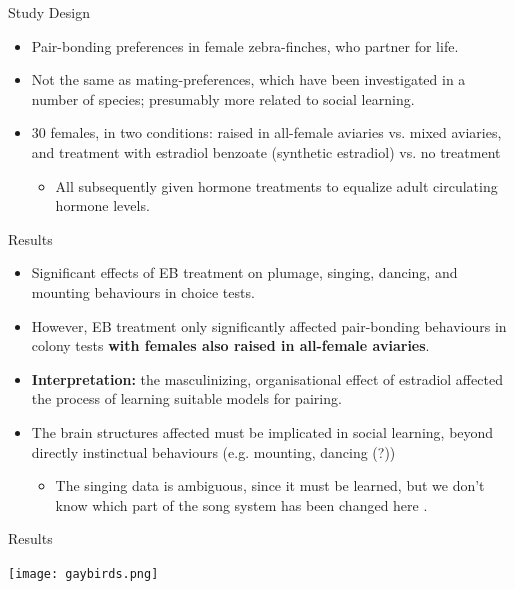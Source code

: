 \documentclass[hyperref={pdfpagelabels=false}]{beamer}
\begin{document}
\begin{frame}{\citet{mansukhanietal1996}}
\begin{block}{Study Design}
\begin{itemize}
	\item Pair-bonding preferences in female zebra-finches, who partner for life.
	\item Not the same as mating-preferences, which have been investigated in a number of species; presumably more related to social learning.
	\item 30 females, in two conditions: raised in all-female aviaries vs. mixed aviaries, and treatment with estradiol benzoate (synthetic estradiol) vs. no treatment
		\begin{itemize}
		\item All subsequently given hormone treatments to equalize adult circulating hormone levels.
		\end{itemize}
\end{itemize}
\end{block}
\end{frame}

\begin{frame}{\citet{mansukhanietal1996}}
\begin{block}{Results}
\begin{itemize}
	\item Significant effects of EB treatment on plumage, singing, dancing, and mounting behaviours in choice tests.
	\item However, EB treatment only significantly affected pair-bonding behaviours in colony tests \textbf{with females also raised in all-female aviaries}.
	\item \textbf{Interpretation:} the masculinizing, organisational effect of estradiol affected the process of learning suitable models for pairing.
	\item The brain structures affected must be implicated in social learning, beyond directly instinctual behaviours (e.g. mounting, dancing (?))
		\begin{itemize}
			\item The singing data is ambiguous, since it must be learned, but we don't know which part of the song system has been changed here \citep[see][]{balthazartetal2009}.
		\end{itemize}
	\end{itemize}
\end{block}
\end{frame}

\begin{frame}{\citet{mansukhanietal1996}}
\begin{block}{Results}
\begin{center}
	\texttt{[image: gaybirds.png]}
	\end{center}
\end{block}
\end{frame}
\end{document}
